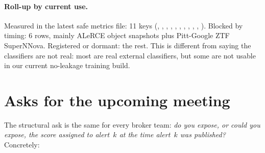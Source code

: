 \documentclass[11pt]{article}
\begin{document}
\paragraph{Roll-up by current use.}
Measured in the latest safe metrics file: 11 keys
(, , ,
, ,
, ,
, , ,
). Blocked by timing: 6 rows, mainly ALeRCE
object snapshots plus Pitt-Google ZTF SuperNNova. Registered or dormant:
the rest. This is different from saying the classifiers are not real:
most are real external classifiers, but some are not usable in our
current no-leakage training build.

\section{Asks for the upcoming meeting}

The structural ask is the same for every broker team: \emph{do you
expose, or could you expose, the score assigned to alert~$k$ at the time
alert~$k$ was published?} Concretely:
\end{document}
